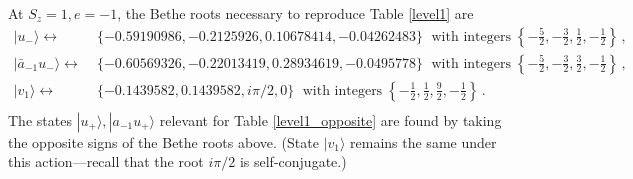 \documentclass[a4paper,10pt]{article}
\newcommand{\jesper}[1]{$\framebox{\tiny J}$\ \textbf{\texttt{{\color{cyan}\footnotesize#1}}}}
\begin{document}
At $S_z=1, e=-1$, the Bethe roots necessary to reproduce Table \ref{level1} are
\begin{equation}
\begin{split}
| u_- \rangle \leftrightarrow& \;  \{ -0.59190986 , -0.2125926 , 0.10678414 , -0.04262483 \}
 \;\text{ with integers}\; \left\{ -\frac{5}{2}, -\frac{3}{2},\frac{1}{2},-\frac{1}{2} \right\} \,, \\%
| \bar{a}_{-1} u_-\rangle \leftrightarrow&\; \{ -0.60569326 , -0.22013419 , 0.28934619 , -0.0495778 \}
 \;\text{ with integers}\; \left\{ -\frac{5}{2}, -\frac{3}{2},\frac{3}{2},-\frac{1}{2} \right\} \,, \\%
| v_1\rangle \leftrightarrow& \; \{ -0.1439582 , 0.1439582 , i\pi/2 , 0 \}  \;\text{ with integers}\; \left\{ -\frac{1}{2}, \frac{1}{2},\frac{9}{2},-\frac{1}{2} \right\} \,. \\%
\end{split}
\end{equation}
The states $| u_+\rangle,  | {a}_{-1} u_+ \rangle $ relevant for Table \ref{level1_opposite} are found by taking the opposite signs of the Bethe roots above. (State $|v_1\rangle$ remains the same under this action---recall that the root $i\pi/2$ is self-conjugate.)
\end{document}
